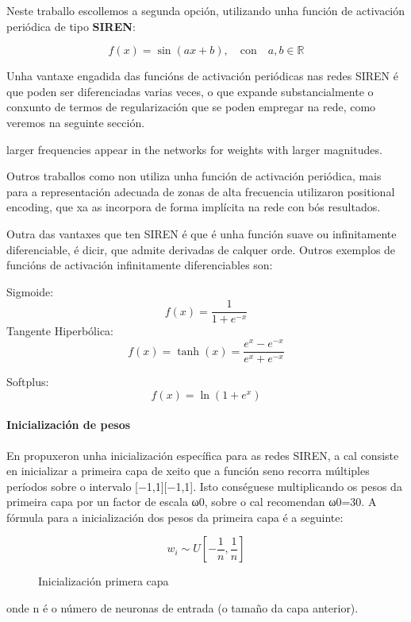 Neste traballo escollemos a segunda opción, utilizando unha función de activación periódica de tipo \textbf{SIREN}:

\[
f(x) = \sin(ax + b), \quad \text{con} \quad a, b \in \mathbb{R}
\]

Unha vantaxe engadida das funcións de activación periódicas nas redes SIREN é que poden ser diferenciadas varias veces, 
o que expande substancialmente o conxunto de termos de regularización que se poden empregar na rede, como veremos na seguinte sección.

larger frequencies appear in the networks for weights with larger magnitudes.

Outros traballos como \cite{mildenhall2020nerfrepresentingscenesneural} non utiliza unha función de activación periódica, mais para a representación adecuada de zonas de alta frecuencia 
utilizaron positional encoding, que xa as incorpora de forma implícita na rede con bós resultados. 

Outra das vantaxes que ten SIREN é que é unha función suave ou infinitamente diferenciable, é dicir, que admite derivadas de calquer orde.
Outros exemplos de funcións de activación infinitamente diferenciables son:

Sigmoide:  
\[
f(x) = \frac{1}{1 + e^{-x}}
\]
Tangente Hiperbólica:  
\[
f(x) = \tanh(x) = \frac{e^x - e^{-x}}{e^x + e^{-x}}
\]

Softplus:  
\[
f(x) = \ln(1 + e^x)
\]


\paragraph{Inicialización de pesos}

En \cite{sitzmann2020implicitneuralrepresentationsperiodic} propuxeron unha inicialización específica para as redes SIREN, 
a cal consiste en inicializar a primeira capa de xeito que a función seno recorra múltiples períodos sobre o intervalo [−1,1][−1,1].
Isto conséguese multiplicando os pesos da primeira capa por un factor de escala ω0, sobre o cal recomendan ω0=30.
A fórmula para a inicialización dos pesos da primeira capa é a seguinte:

\begin{figure}[ht!]
    \centering
    \[
    w_i \sim U\left[ -\frac{1}{n}, \frac{1}{n} \right]
    \]

\caption{Inicialización primera capa}
\end{figure}

onde n é o número de neuronas de entrada (o tamaño da capa anterior).

